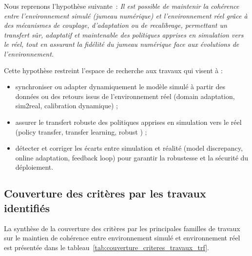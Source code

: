 Nous reprenons l’hypothèse suivante~: \textit{Il est possible de maintenir la cohérence entre l’environnement simulé (jumeau numérique) et l’environnement réel grâce à des mécanismes de couplage, d’adaptation ou de recalibrage, permettant un transfert sûr, adaptatif et maintenable des politiques apprises en simulation vers le réel, tout en assurant la fidélité du jumeau numérique face aux évolutions de l’environnement.}

Cette hypothèse restreint l’espace de recherche aux travaux qui visent à :
\begin{itemize}
    \item synchroniser ou adapter dynamiquement le modèle simulé à partir des données ou des retours issus de l’environnement réel (domain adaptation, sim2real, calibration dynamique) ;
    \item assurer le transfert robuste des politiques apprises en simulation vers le réel (policy transfer, transfer learning, robust ) ;
    \item détecter et corriger les écarts entre simulation et réalité (model discrepancy, online adaptation, feedback loop) pour garantir la robustesse et la sécurité du déploiement.
\end{itemize}



\subsection*{Couverture des critères par les travaux identifiés}

La synthèse de la couverture des critères par les principales familles de travaux sur le maintien de cohérence entre environnement simulé et environnement réel est présentée dans le tableau~\ref{tab:couverture_criteres_travaux_trf}.

